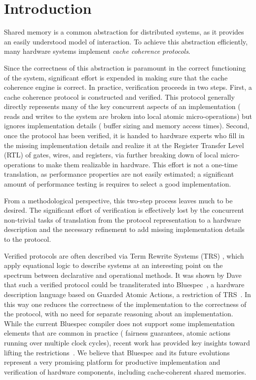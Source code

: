 \section{Introduction}
\label{Sec:Introduction}

Shared memory is a common abstraction for distributed systems, as it
provides an easily understood model of interaction. To achieve this
abstraction efficiently, many hardware systems implement \emph{cache
coherence protocols}.

Since the correctness of this abstraction is paramount in the correct
functioning of the system, significant effort is expended in making sure
that the cache coherence engine is correct. In practice, verification proceeds
in two steps. First, a cache coherence protocol is constructed and
verified. This protocol generally directly represents many of
the key concurrent aspects of an implementation (\eg{} reads and
writes to the system are broken into local atomic micro-operations) but
ignores implementation details (\eg{} buffer sizing and memory access
times). Second, once the protocol has been verified, it is handed to
hardware experts who fill in the missing implementation details and
realize it at the Register Transfer Level (RTL) of gates, wires, and
registers, via further breaking down of local micro-operations to
make them realizable in hardware. This effort is not a one-time translation, as
performance properties are not easily estimated; a significant amount of
performance testing is requires to select a good implementation. 

From a methodological perspective, this two-step process leaves much
to be desired. The significant effort of
verification is effectively lost by the concurrent non-trivial tasks
of translation from the protocol representation to a hardware
description and the necessary refinement to add missing implementation
details to the protocol. 

Verified protocols are often described via Term Rewrite
Systems (TRS) , which apply equational logic to describe systems at an
interesting point on the spectrum between declarative and operational methods.
It was shown by Dave
\etal{}~\cite{DNA:CoherenceImplementation} that such a verified
protocol could be transliterated into Bluespec~\cite{Bluespec:TFRG}, a
hardware description language based on Guarded Atomic Actions, a
restriction of TRS~\cite{Hoe:TCAD}. In this way one reduces the correctness of
the implementation to the correctness of the protocol, with no need
for separate reasoning about an implementation. While the current Bluespec compiler
does not support some implementation elements that are common in practice
(\eg{} fairness guarantees, atomic actions running over multiple clock cycles),
recent work has provided key insights toward lifting the
restrictions~\cite{DNA:CoherenceImplementation, Karczmarek}.  We
believe that Bluespec and its future evolutions represent a
very promising platform for productive implementation and
verification of hardware components, including cache-coherent
shared memories.


